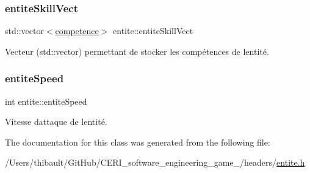 \subsubsection{\texorpdfstring{entite\+Skill\+Vect}{entiteSkillVect}}
{\footnotesize\ttfamily std\+::vector$<$\hyperlink{classcompetence}{competence}$>$ entite\+::entite\+Skill\+Vect\hspace{0.3cm}{\ttfamily [protected]}}



Vecteur ({\ttfamily std\+::vector}) permettant de stocker les compétences de l\textquotesingle{}entité. 

\mbox{\label{classentite_ad9df70a9bb07f07b3ebf520941c3a35f}} 
\subsubsection{\texorpdfstring{entite\+Speed}{entiteSpeed}}
{\footnotesize\ttfamily int entite\+::entite\+Speed\hspace{0.3cm}{\ttfamily [protected]}}



Vitesse d\textquotesingle{}attaque de l\textquotesingle{}entité. 



The documentation for this class was generated from the following file\+:\begin{DoxyCompactItemize}
\item 
/\+Users/thibault/\+Git\+Hub/\+C\+E\+R\+I\+\_\+software\+\_\+engineering\+\_\+game\+\_/headers/\hyperlink{entite_8h}{entite.\+h}\end{DoxyCompactItemize}

